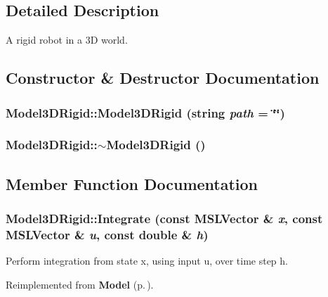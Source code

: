 \subsection{Detailed Description}
A rigid robot in a 3D world.



\subsection{Constructor \& Destructor Documentation}
\subsubsection{\setlength{\rightskip}{0pt plus 5cm}Model3DRigid::Model3DRigid (string {\em path} = \char`\"{}\char`\"{})}\label{classModel3DRigid_a0}


\subsubsection{\setlength{\rightskip}{0pt plus 5cm}Model3DRigid::$\sim$Model3DRigid ()\hspace{0.3cm}{\tt  [inline, virtual]}}\label{classModel3DRigid_a1}




\subsection{Member Function Documentation}
\subsubsection{ Model3DRigid::Integrate (const {\bf MSLVector} \& {\em x}, const {\bf MSLVector} \& {\em u}, const double \& {\em h})\hspace{0.3cm}{\tt  [virtual]}}\label{classModel3DRigid_a2}


Perform integration from state x, using input u, over time step h.



Reimplemented from {\bf Model} {\rm (p.\,\pageref{classModel_a5})}.

